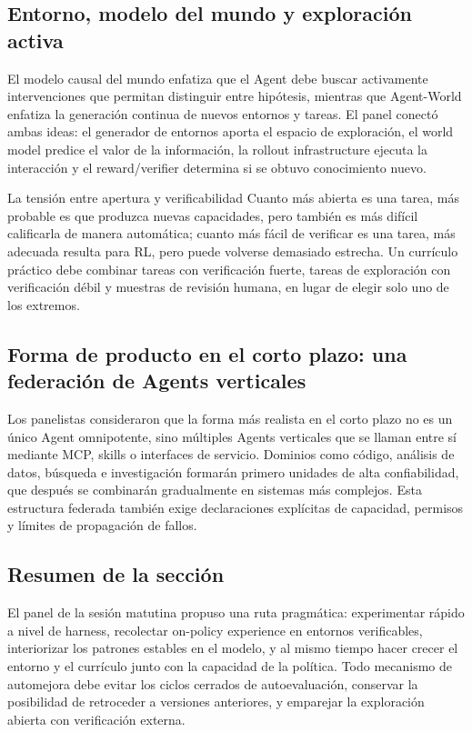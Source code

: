 \subsection{Entorno, modelo del mundo y exploración activa}

El modelo causal del mundo enfatiza que el Agent debe buscar activamente intervenciones que permitan distinguir entre hipótesis, mientras que Agent-World enfatiza la generación continua de nuevos entornos y tareas. El panel conectó ambas ideas: el generador de entornos aporta el espacio de exploración, el world model predice el valor de la información, la rollout infrastructure ejecuta la interacción y el reward/verifier determina si se obtuvo conocimiento nuevo.

\begin{importantbox}{La tensión entre apertura y verificabilidad}
Cuanto más abierta es una tarea, más probable es que produzca nuevas capacidades, pero también es más difícil calificarla de manera automática; cuanto más fácil de verificar es una tarea, más adecuada resulta para RL, pero puede volverse demasiado estrecha. Un currículo práctico debe combinar tareas con verificación fuerte, tareas de exploración con verificación débil y muestras de revisión humana, en lugar de elegir solo uno de los extremos.
\end{importantbox}

\subsection{Forma de producto en el corto plazo: una federación de Agents verticales}

Los panelistas consideraron que la forma más realista en el corto plazo no es un único Agent omnipotente, sino múltiples Agents verticales que se llaman entre sí mediante MCP, skills o interfaces de servicio. Dominios como código, análisis de datos, búsqueda e investigación formarán primero unidades de alta confiabilidad, que después se combinarán gradualmente en sistemas más complejos. Esta estructura federada también exige declaraciones explícitas de capacidad, permisos y límites de propagación de fallos.

\subsection{Resumen de la sección}

El panel de la sesión matutina propuso una ruta pragmática: experimentar rápido a nivel de harness, recolectar on-policy experience en entornos verificables, interiorizar los patrones estables en el modelo, y al mismo tiempo hacer crecer el entorno y el currículo junto con la capacidad de la política. Todo mecanismo de automejora debe evitar los ciclos cerrados de autoevaluación, conservar la posibilidad de retroceder a versiones anteriores, y emparejar la exploración abierta con verificación externa.

